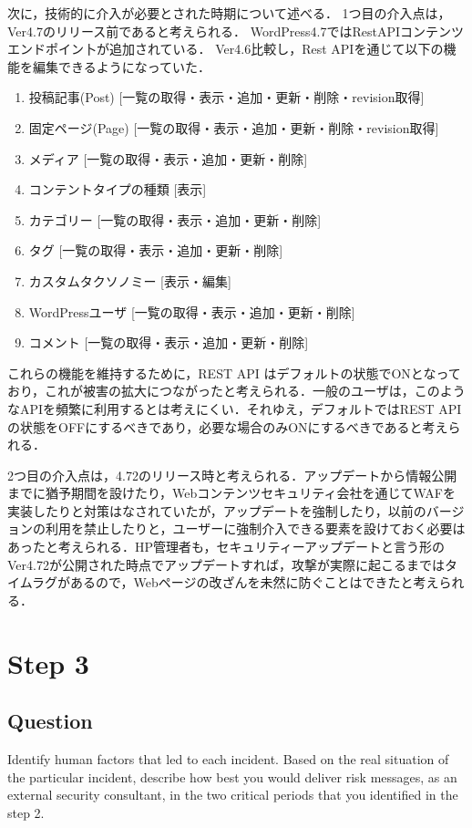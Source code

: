 \documentclass[uplatex]{jsarticle}
\begin{document}
次に，技術的に介入が必要とされた時期について述べる．
1つ目の介入点は，Ver4.7のリリース前であると考えられる．
WordPress4.7ではRestAPIコンテンツエンドポイン卜が追加されている．
Ver4.6比較し，Rest APIを通じて以下の機能を編集できるようになっていた．
\begin{enumerate}
    \item 投稿記事(Post) [一覧の取得・表示・追加・更新・削除・revision取得]
    \item 固定ページ(Page) [一覧の取得・表示・追加・更新・削除・revision取得]
    \item メディア [一覧の取得・表示・追加・更新・削除]
    \item コンテントタイプの種類 [表示]
    \item カテゴリー [一覧の取得・表示・追加・更新・削除]
    \item タグ [一覧の取得・表示・追加・更新・削除]
    \item カスタムタクソノミー [表示・編集]
    \item WordPressユーザ [一覧の取得・表示・追加・更新・削除]
    \item コメント [一覧の取得・表示・追加・更新・削除]
\end{enumerate}
これらの機能を維持するために，REST API はデフォルトの状態でONとなっており，これが被害の拡大につながったと考えられる．一般のユーザは，このようなAPIを頻繁に利用するとは考えにくい．それゆえ，デフォルトではREST APIの状態をOFFにするべきであり，必要な場合のみONにするべきであると考えられる．

2つ目の介入点は，4.72のリリース時と考えられる．アップデートから情報公開までに猶予期間を設けたり，Webコンテンツセキュリティ会社を通じてWAFを実装したりと対策はなされていたが，アップデートを強制したり，以前のバージョンの利用を禁止したりと，ユーザーに強制介入できる要素を設けておく必要はあったと考えられる．HP管理者も，セキュリティーアップデートと言う形のVer4.72が公開された時点でアップデートすれば，攻撃が実際に起こるまではタイムラグがあるので，Webページの改ざんを未然に防ぐことはできたと考えられる．

\section*{Step 3}
\subsection*{Question}
Identify human factors that led to each incident. Based on the real situation of the particular incident, describe how best you would deliver risk messages, as an external security consultant, in the two critical periods that you identified in the step 2.
\end{document}
